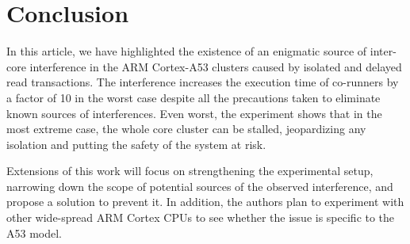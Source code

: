\section{Conclusion}
%

    In this article, we have highlighted the existence of an enigmatic source of inter-core interference in the ARM Cortex-A53 clusters caused by isolated and delayed read transactions.
    The interference increases the execution time of co-runners by a factor of 10 in the worst case despite all the precautions taken to eliminate known sources of interferences.
    Even worst, the experiment shows that in the most extreme case, the whole core cluster can be stalled, jeopardizing any isolation and putting the safety of the system at risk.

    Extensions of this work will focus on strengthening the experimental setup, narrowing down the scope of potential sources of the observed interference, and propose a solution to prevent it. In addition, the authors plan to experiment with other wide-spread ARM Cortex CPUs to see whether the issue is specific to the A53 model.
